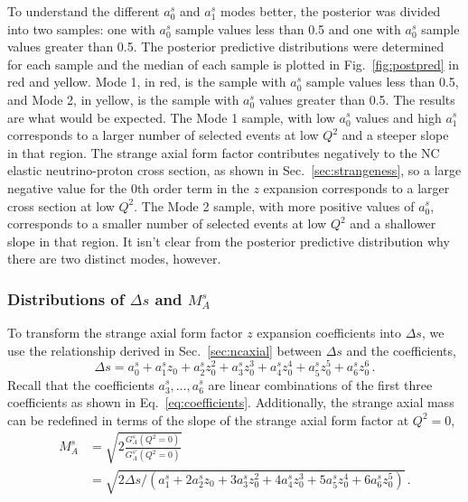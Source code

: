     To understand the different $a_0^s$ and $a_1^s$ modes better, the posterior
    was divided into two samples: one with $a_0^s$ sample values less than 0.5
    and one with $a_0^s$ sample values greater than 0.5. The posterior
    predictive distributions were determined for each sample and the median of
    each sample is plotted in Fig.~\ref{fig:postpred} in red and yellow. Mode
    1, in red, is the sample with $a_0^s$ sample values less than 0.5, and Mode
    2, in yellow, is the sample with $a_0^s$ values greater than 0.5. The
    results are what would be expected. The Mode 1 sample, with low $a_0^s$
    values and high $a_1^s$ corresponds to a larger number of selected events
    at low $Q^2$ and a steeper slope in that region. The strange axial form
    factor contributes negatively to the NC elastic neutrino-proton cross
    section, as shown in Sec.~\ref{sec:strangeness}, so a large negative value
    for the $0$th order term in the $z$ expansion corresponds to a larger cross
    section at low $Q^2$. The Mode 2 sample, with more positive values of
    $a_0^s$, corresponds to a smaller number of selected events at low $Q^2$
    and a shallower slope in that region. It isn't clear from the posterior
    predictive distribution why there are two distinct modes, however.

  \subsubsection{Distributions of $\Delta s$ and $M_A^s$}

    To transform the strange axial form factor $z$ expansion coefficients into
    $\Delta s$, we use the relationship derived in Sec.~\ref{sec:ncaxial}
    between $\Delta s$ and the coefficients,
    \begin{equation}
      \Delta s = a_0^s + a_1^s z_0 + a_2^s z_0^2 
        + a_3^s z_0^3 + a_4^s z_0^4 + a_5^s z_0^5 + a_6^s z_0^6 \,.
    \end{equation}
    Recall that the coefficients $a_3^s,\ldots,a_6^s$ are linear combinations
    of the first three coefficients as shown in Eq.~\ref{eq:coefficients}.
    Additionally, the strange axial mass can be redefined in terms of the slope
    of the strange axial form factor at $Q^2=0$, \begin{equation}
    \begin{aligned} M_A^s &= \sqrt{2\frac{G_A^s(Q^2=0)}{G_A^{s\prime}(Q^2=0)}}
    \\ &= \sqrt{2 \Delta s/(a_1^s + 2a_2^s z_0 + 3a_3^s z_0^2 + 4a_4^s z_0^3 +
    5a_5^s z_0^4 + 6a_6^s z_0^5)} \,.  \end{aligned} \end{equation}

